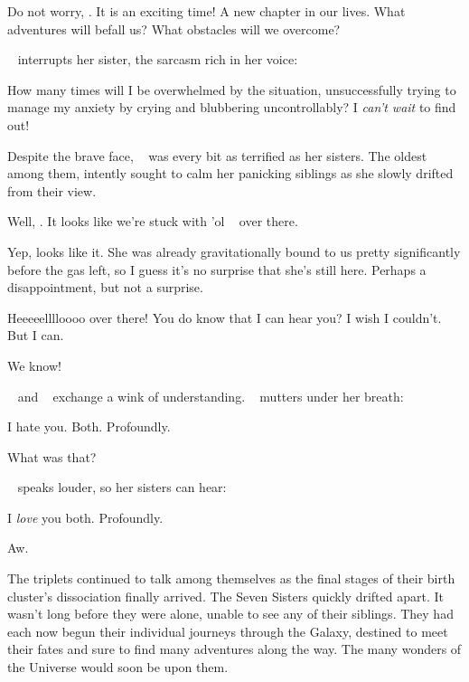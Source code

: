 \documentclass[main.tex]{subfiles}
\begin{document}
\par \Sterope Do not worry, \rmelectra.  It is an exciting time!  A new chapter in our lives.  What adventures will befall us?  What obstacles will we overcome?  

\par \nar \rmelectra~ interrupts her sister, the sarcasm rich in her voice:

\par \Electra How many times will I be overwhelmed by the situation, unsuccessfully trying to manage my anxiety by crying and blubbering uncontrollably? I \textit{can't wait} to find out!

\par \nar Despite the brave face, \rmmaia~ was every bit as terrified as her sisters.  The oldest among them, \rmmaia intently sought to calm her panicking siblings as she slowly drifted from their view.

\par \Taygete Well, \rmalcyone.  It looks like we're stuck with 'ol \rmcelaeno~ over there.

\par \Alcyone Yep, looks like it.  She was already gravitationally bound to us pretty significantly before the gas left, so I guess it's no surprise that she's still here.  Perhaps a disappointment, but not a surprise.

\par \Celaeno Heeeeelllloooo over there!  You do know that I can hear you?  I wish I couldn't.  But I can.  

\par \Taygete We know! 

\par \nar \rmtaygete~ and \rmalcyone~ exchange a wink of understanding.  \rmcelaeno~ mutters under her breath:

\par \Celaeno I hate you.  Both.  Profoundly.

\par \Taygete What was that?

\par \nar \rmcelaeno~ speaks louder, so her sisters can hear:

\par \Celaeno I \textit{love} you both.  Profoundly.

\par \Alcyone Aw.

\par \nar The triplets continued to talk among themselves as the final stages of their birth cluster's dissociation finally arrived.  The Seven Sisters quickly drifted apart.  It wasn't long before they were alone, unable to see any of their siblings.  They had each now begun their individual journeys through the Galaxy, destined to meet their fates and sure to find many adventures along the way.  The many wonders of the Universe would soon be upon them.
\end{document}
